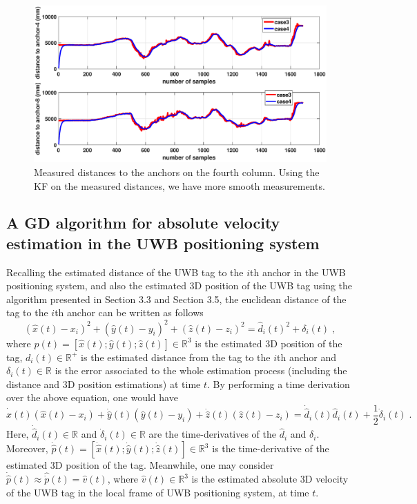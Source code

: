 \documentclass{article}
\begin{document}
\begin{figure}[thpb]
\centering
\includegraphics[scale=0.4]{Pics/Fig_logged/dist_48.eps}
\caption{Measured distances to the anchors on the fourth column. Using the KF on the measured distances, we have more smooth measurements.}
\label{Fig_logged_08}
\end{figure}

\newpage
\subsection{A GD algorithm for absolute velocity estimation in the UWB positioning system}
Recalling the estimated distance of the UWB tag to the $i$th anchor in the UWB positioning system, and also the estimated 3D position of the UWB tag using the algorithm presented in Section 3.3 and Section 3.5, the euclidean distance of the tag to the $i$th anchor can be written as follows
\begin{equation} \label{Eq_AbsVel_01}
(\hat{x}(t) - x_i)^2 + (\hat{y}(t) - y_i)^2 + (\hat{z}(t) - z_i)^2 = \hat{d}_i(t)^2 + \delta_i(t) \;,
\end{equation}
where $\hat{p}(t) = [\hat{x}(t);\hat{y}(t);\hat{z}(t)] \in \mathbb{R}^3$ is the estimated 3D position of the tag, $d_i(t) \in \mathbb{R}^+$ is the estimated distance from the tag to the $i$th anchor and $\delta_i(t) \in \mathbb{R}$ is the error associated to the whole estimation process (including the distance and 3D position estimations) at time $t$.
By performing a time derivation over the above equation, one would have
\begin{equation} \label{Eq_AbsVel_02}
\dot{\hat{x}}(t) (\hat{x}(t) - x_i) + \dot{\hat{y}}(t) (\hat{y}(t) - y_i) + \dot{\hat{z}}(t) (\hat{z}(t) - z_i) = \dot{\hat{d}}_i(t) \hat{d}_i(t) + \frac{1}{2} \dot{\delta}_i(t) \;.
\end{equation}
Here, $\dot{\hat{d}}_i(t) \in \mathbb{R}$ and $\dot{\delta}_i(t) \in \mathbb{R}$ are the time-derivatives of the $\hat{d}_i$ and $\delta_i$.
Moreover, $\dot{\hat{p}}(t) = [\dot{\hat{x}}(t);\dot{\hat{y}}(t);\dot{\hat{z}}(t)] \in \mathbb{R}^3$ is the time-derivative of the estimated 3D position of the tag.
Meanwhile, one may consider $\dot{\hat{p}}(t) \approx \hat{\dot{p}}(t) = \hat{v}(t)$, where $\hat{v}(t) \in \mathbb{R}^3$ is the estimated absolute 3D velocity of the UWB tag in the local frame of UWB positioning system, at time $t$.
\end{document}
